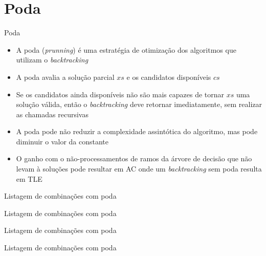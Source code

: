 \section{Poda}

\begin{frame}[fragile]{Poda}

    \begin{itemize}
        \item A poda (\textit{prunning}) é uma estratégia de otimização dos algoritmos que 
            utilizam o \textit{backtracking}

        \item A poda avalia a solução parcial $xs$ e os candidatos disponíveis $cs$

        \item Se os candidatos ainda disponíveis não são mais capazes de tornar $xs$ uma solução
            válida, então o \textit{backtracking} deve retornar imediatamente, sem realizar
            as chamadas recursivas

        \item A poda pode não reduzir a complexidade assintótica do algoritmo, mas pode diminuir
            o valor da constante

        \item O ganho com o não-processamentos de ramos da árvore de decisão que não levam à
            soluções pode resultar em AC onde um \textit{backtracking} sem poda resulta em
            TLE
    \end{itemize}

\end{frame}

\begin{frame}[fragile]{Listagem de combinações com poda}
\end{frame}

\begin{frame}[fragile]{Listagem de combinações com poda}
\end{frame}

\begin{frame}[fragile]{Listagem de combinações com poda}
\end{frame}

\begin{frame}[fragile]{Listagem de combinações com poda}
\end{frame}
